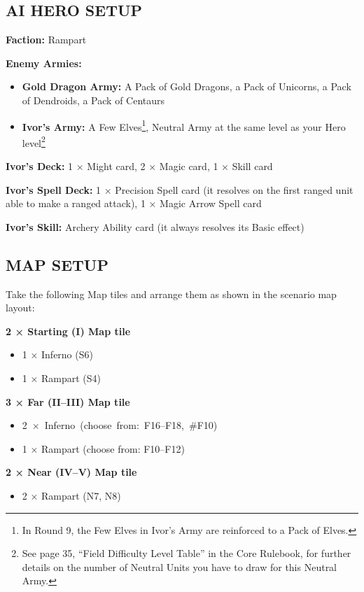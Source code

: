 \begin{multicols*}{2}
\subsection*{\MakeUppercase{AI hero setup}}

\textbf{Faction:} Rampart

\textbf{Enemy Armies:}

\begin{itemize}
  \item \textbf{Gold Dragon Army:} A Pack of Gold Dragons, a Pack of Unicorns, a Pack of Dendroids, a Pack of Centaurs
  \item \textbf{Ivor's Army:} A Few Elves\footnote{In Round 9, the Few Elves in Ivor's Army are reinforced to a Pack of Elves.}, Neutral Army at the same level as your Hero level\footnote{See page 35, ``Field Difficulty Level Table'' in the Core Rulebook, for further details on the number of Neutral Units you have to draw for this Neutral Army.}
\end{itemize}

\textbf{Ivor's Deck:} 1 × Might card, 2 × Magic card, 1 × Skill card

\textbf{Ivor's Spell Deck:} 1 × Precision Spell card (it resolves on the first ranged unit able to make a ranged attack), 1 × Magic Arrow Spell card

\textbf{Ivor's Skill:} Archery Ability card (it always resolves its Basic effect)

\subsection*{\MakeUppercase{Map setup}}

Take the following Map tiles and arrange them as shown in the scenario map layout:

\textbf{2 × Starting (I) Map tile}
\begin{itemize}
  \item 1 × Inferno (S6)
  \item 1 × Rampart (S4)
\end{itemize}

\textbf{3 × Far (II--III) Map tile}
\begin{itemize}
  \item \mbox{2 × Inferno (choose from: F16--F18, \#F10)}
  \item 1 × Rampart (choose from: F10--F12)
\end{itemize}

\textbf{2 × Near (IV--V) Map tile}
\begin{itemize}
  \item 2 × Rampart (N7, N8)
\end{itemize}


\end{multicols*}
